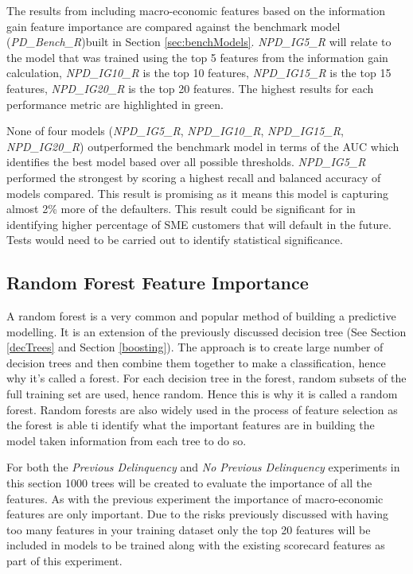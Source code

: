 The results from including macro-economic features based on the information gain feature importance are compared against the benchmark model (\textit{PD\_Bench\_R})built in Section \ref{sec:benchModels}. \textit{NPD\_IG5\_R} will relate to the model that was trained using the top 5 features from the information gain calculation, \textit{NPD\_IG10\_R} is the top 10 features, \textit{NPD\_IG15\_R} is the top 15 features, \textit{NPD\_IG20\_R} is the top 20 features. The highest results for each performance metric are highlighted in green.

None of four models (\textit{NPD\_IG5\_R}, \textit{NPD\_IG10\_R}, \textit{NPD\_IG15\_R}, \textit{NPD\_IG20\_R}) outperformed the benchmark model in terms of the AUC which identifies the best model based over all possible thresholds. \textit{NPD\_IG5\_R} performed the strongest by scoring a highest recall and balanced accuracy of models compared. This result is promising as it means this model is capturing almost 2\% more of the defaulters. This result could be significant for in identifying higher percentage of SME customers that will default in the future. Tests would need to be carried out to identify statistical significance.


\subsection{Random Forest Feature Importance}
A random forest is a very common and popular method of building a predictive modelling. It is an extension of the previously discussed decision tree (See Section \ref{decTrees} and Section \ref{boosting}). The approach is to create large number of decision trees and then combine them together to make a classification, hence why it's called a forest. For each decision tree in the forest, random subsets of the full training set are used, hence random. Hence this is why it is called a random forest. Random forests are also widely used in the process of feature selection as the forest is able ti identify what the important features are in building the model taken information from each tree to do so.

For both the \textit{Previous Delinquency} and \textit{No Previous Delinquency} experiments in this section 1000 trees will be created to evaluate the importance of all the features. As with the previous experiment the importance of macro-economic features are only important. Due to the risks previously discussed
with having too many features in your training dataset only the top 20 features will be
included in models to be trained along with the existing scorecard features as part of this experiment. 


